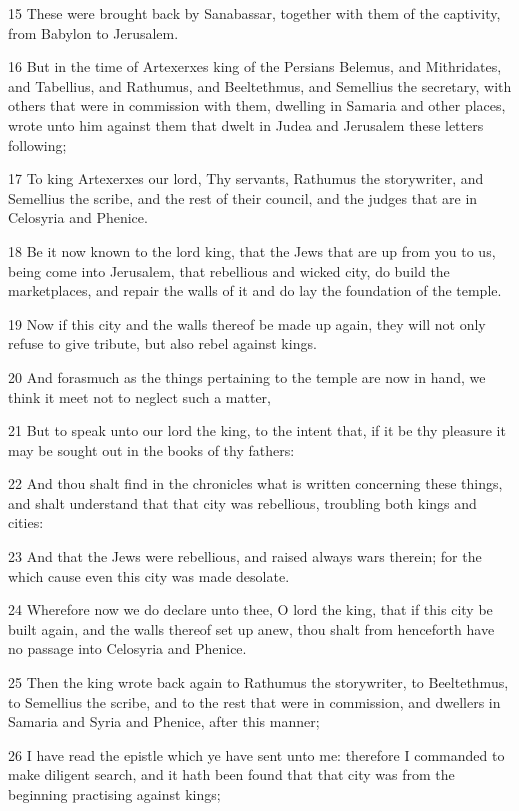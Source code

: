 \par 15 These were brought back by Sanabassar, together with them of the captivity, from Babylon to Jerusalem.
\par 16 But in the time of Artexerxes king of the Persians Belemus, and Mithridates, and Tabellius, and Rathumus, and Beeltethmus, and Semellius the secretary, with others that were in commission with them, dwelling in Samaria and other places, wrote unto him against them that dwelt in Judea and Jerusalem these letters following;
\par 17 To king Artexerxes our lord, Thy servants, Rathumus the storywriter, and Semellius the scribe, and the rest of their council, and the judges that are in Celosyria and Phenice.
\par 18 Be it now known to the lord king, that the Jews that are up from you to us, being come into Jerusalem, that rebellious and wicked city, do build the marketplaces, and repair the walls of it and do lay the foundation of the temple.
\par 19 Now if this city and the walls thereof be made up again, they will not only refuse to give tribute, but also rebel against kings.
\par 20 And forasmuch as the things pertaining to the temple are now in hand, we think it meet not to neglect such a matter,
\par 21 But to speak unto our lord the king, to the intent that, if it be thy pleasure it may be sought out in the books of thy fathers:
\par 22 And thou shalt find in the chronicles what is written concerning these things, and shalt understand that that city was rebellious, troubling both kings and cities:
\par 23 And that the Jews were rebellious, and raised always wars therein; for the which cause even this city was made desolate.
\par 24 Wherefore now we do declare unto thee, O lord the king, that if this city be built again, and the walls thereof set up anew, thou shalt from henceforth have no passage into Celosyria and Phenice.
\par 25 Then the king wrote back again to Rathumus the storywriter, to Beeltethmus, to Semellius the scribe, and to the rest that were in commission, and dwellers in Samaria and Syria and Phenice, after this manner;
\par 26 I have read the epistle which ye have sent unto me: therefore I commanded to make diligent search, and it hath been found that that city was from the beginning practising against kings;
